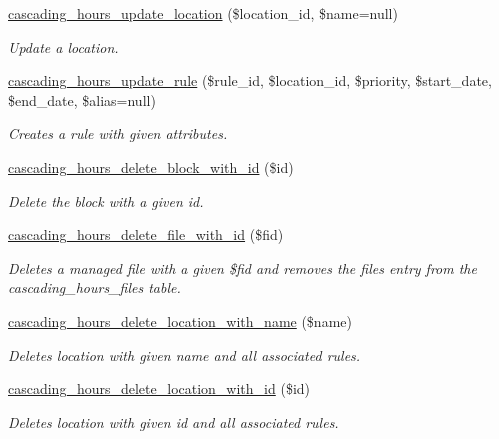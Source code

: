 \begin{DoxyCompactItemize}
\hyperlink{cascading__hours_8module_aa7017fa11853d11173754de324beb14e_aa7017fa11853d11173754de324beb14e}{cascading\+\_\+hours\+\_\+update\+\_\+location} (\$location\+\_\+id, \$name=null)
\begin{DoxyCompactList}\small\item\em Update a location. \end{DoxyCompactList}\item 
\hyperlink{cascading__hours_8module_a0fd30c88c7733051a0b9af2c75575e30_a0fd30c88c7733051a0b9af2c75575e30}{cascading\+\_\+hours\+\_\+update\+\_\+rule} (\$rule\+\_\+id, \$location\+\_\+id, \$priority, \$start\+\_\+date, \$end\+\_\+date, \$alias=null)
\begin{DoxyCompactList}\small\item\em Creates a rule with given attributes. \end{DoxyCompactList}\item 
\hyperlink{cascading__hours_8module_a30e7a42b8d48bed477ddac1cb2f41bfb_a30e7a42b8d48bed477ddac1cb2f41bfb}{cascading\+\_\+hours\+\_\+delete\+\_\+block\+\_\+with\+\_\+id} (\$id)
\begin{DoxyCompactList}\small\item\em Delete the block with a given id. \end{DoxyCompactList}\item 
\hyperlink{cascading__hours_8module_a3cf426157c72885a1b48a953edad4a99_a3cf426157c72885a1b48a953edad4a99}{cascading\+\_\+hours\+\_\+delete\+\_\+file\+\_\+with\+\_\+id} (\$fid)
\begin{DoxyCompactList}\small\item\em Deletes a managed file with a given \$fid and removes the file\textquotesingle{}s entry from the cascading\+\_\+hours\+\_\+files table. \end{DoxyCompactList}\item 
\hyperlink{cascading__hours_8module_a3aa887750d997746fd97761eedd1bfad_a3aa887750d997746fd97761eedd1bfad}{cascading\+\_\+hours\+\_\+delete\+\_\+location\+\_\+with\+\_\+name} (\$name)
\begin{DoxyCompactList}\small\item\em Deletes location with given name and all associated rules. \end{DoxyCompactList}\item 
\hyperlink{cascading__hours_8module_a2f693f626c2a1f31e1382f954b7378d5_a2f693f626c2a1f31e1382f954b7378d5}{cascading\+\_\+hours\+\_\+delete\+\_\+location\+\_\+with\+\_\+id} (\$id)
\begin{DoxyCompactList}\small\item\em Deletes location with given id and all associated rules. \end{DoxyCompactList}\item 

\end{DoxyCompactItemize}
